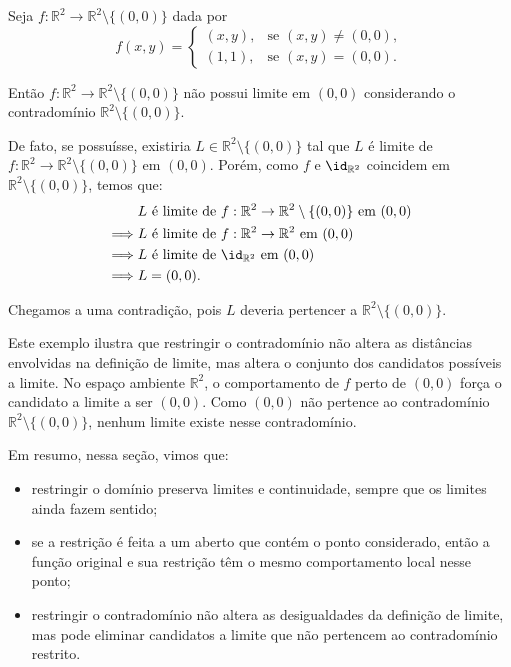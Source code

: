 \begin{example}
    Seja $f:\mathbb R^2\rightarrow \mathbb R^2\setminus\{(0, 0)\}$ dada por
    \[
        f(x, y) =\begin{cases}
            (x, y), & \text{se } (x, y) \neq (0, 0),\\
            (1, 1), & \text{se } (x, y) = (0, 0).
        \end{cases}
    \]

    Então $f:\mathbb R^2\rightarrow \mathbb R^2\setminus\{(0, 0)\}$ não possui limite em $(0,0)$ considerando o contradomínio $\mathbb R^2\setminus\{(0, 0)\}$.

    De fato, se possuísse, existiria $L\in \mathbb R^2\setminus\{(0, 0)\}$ tal que $L$ é limite de $f:\mathbb R^2\rightarrow \mathbb R^2\setminus\{(0, 0)\}$ em $(0, 0)$.
    Porém, como $f$ e $\id_{\mathbb R^2}$ coincidem em $\mathbb R^2\setminus\{(0, 0)\}$, temos que:
    \begin{align*}
        & L \text{ é limite de } f:\mathbb R^2\to \mathbb R^2\setminus\{(0, 0)\} \text{ em } (0, 0) \\
        \implies & L \text{ é limite de } f:\mathbb R^2\to \mathbb R^2 \text{ em } (0, 0)\\
        \implies & L \text{ é limite de } \id_{\mathbb R^2} \text{ em } (0, 0)\\
        \implies & L = (0, 0).
    \end{align*}

    Chegamos a uma contradição, pois $L$ deveria pertencer a $\mathbb R^2\setminus\{(0,0)\}$.
\end{example}

Este exemplo ilustra que restringir o contradomínio não altera as distâncias envolvidas na definição de limite, mas altera o conjunto dos candidatos possíveis a limite.
No espaço ambiente $\mathbb R^2$, o comportamento de $f$ perto de $(0,0)$ força o candidato a limite a ser $(0,0)$.
Como $(0,0)$ não pertence ao contradomínio $\mathbb R^2\setminus\{(0,0)\}$, nenhum limite existe nesse contradomínio.

Em resumo, nessa seção, vimos que:
\begin{itemize}
    \item restringir o domínio preserva limites e continuidade, sempre que os limites ainda fazem sentido;
    \item se a restrição é feita a um aberto que contém o ponto considerado, então a função original e sua restrição têm o mesmo comportamento local nesse ponto;
    \item restringir o contradomínio não altera as desigualdades da definição de limite, mas pode eliminar candidatos a limite que não pertencem ao contradomínio restrito.
\end{itemize}

